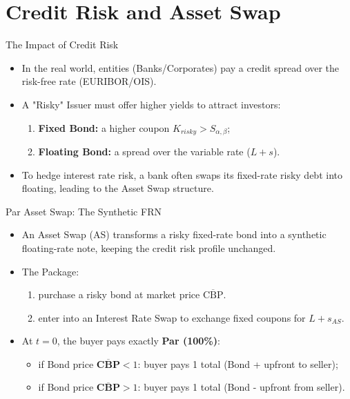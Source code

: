 \documentclass{beamer}
\begin{document}
\section{Credit Risk and Asset Swap}

\begin{frame}{The Impact of Credit Risk}
	\begin{itemize}
		\item In the real world, entities (Banks/Corporates) pay a \textcolor{maincolor}{credit spread} over the risk-free rate (EURIBOR/OIS).
		\item A "Risky" Issuer must offer higher yields to attract investors:
		\begin{enumerate}
			\item \textbf{Fixed Bond:} a higher coupon $K_{risky} > S_{\alpha,\beta}$;
			\item \textbf{Floating Bond:} a spread over the variable rate ($L+s$).
		\end{enumerate}
		\item To hedge interest rate risk, a bank often swaps its fixed-rate risky debt into floating, leading to the Asset Swap structure.
	\end{itemize}
\end{frame}

\begin{frame}{Par Asset Swap: The Synthetic FRN}
	\begin{itemize}
		\item An \textcolor{maincolor}{Asset Swap (AS)} transforms a risky fixed-rate bond into a synthetic floating-rate note, keeping the credit risk profile unchanged.
		\item The Package:
		\begin{enumerate}
			\item purchase a risky bond at market price $\overline{\text{CBP}}$.
			\item enter into an Interest Rate Swap to exchange fixed coupons for $L+s_{AS}$.
		\end{enumerate}
		\item At $t=0$, the buyer pays exactly \textbf{Par (100\%)}:
		\begin{itemize}
			\item if Bond price $\overline{\textbf{CBP}}<1$: buyer pays 1 total (Bond + upfront to seller);
			\item if Bond price $\overline{\textbf{CBP}}>1$: buyer pays 1 total (Bond - upfront from seller).
		\end{itemize}
	\end{itemize}

\end{frame}
\end{document}
